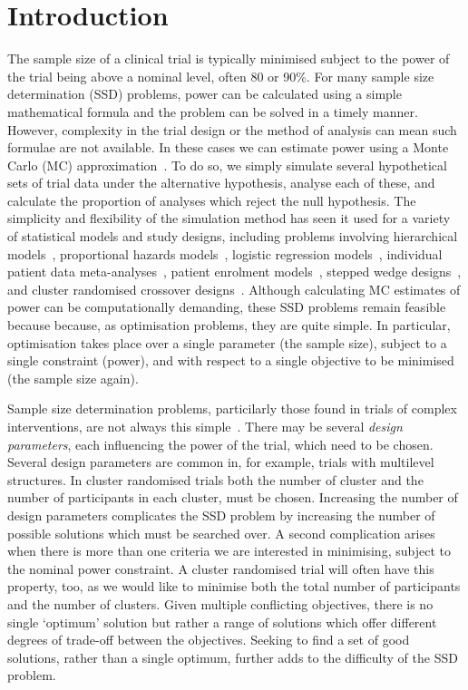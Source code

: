\documentclass{article} %
\begin{document}
\section{Introduction}\label{sec:intro}

The sample size of a clinical trial is typically minimised subject to the power of the trial being above a nominal level, often 80 or 90\%. For many sample size determination (SSD) problems, power can be calculated using a simple mathematical formula and the problem can be solved in a timely manner. However, complexity in the trial design or the method of analysis can mean such formulae are not available. In these cases we can estimate power using a Monte Carlo (MC) approximation~\cite{Arnold2011, Landau2013}. To do so, we simply simulate several hypothetical sets of trial data under the alternative hypothesis, analyse each of these, and calculate the proportion of analyses which reject the null hypothesis. The simplicity and flexibility of the simulation method has seen it used for a variety of statistical models and study designs, including problems involving hierarchical models~\cite{Feng1992, Hooper2013}, proportional hazards models~\cite{Schoenfeld2005}, logistic regression models~\cite{Grieve2016}, individual patient data meta-analyses~\cite{Sutton2007, Kontopantelis2016}, patient enrolment models~\cite{Fedorov2005}, stepped wedge designs~\cite{Baio2015, Hooper2016}, and cluster randomised crossover designs~\cite{Reich2012}. Although calculating MC estimates of power can be computationally demanding, these SSD problems remain feasible because because, as optimisation problems, they are quite simple. In particular, optimisation takes place over a single parameter (the sample size), subject to a single constraint (power), and with respect to a single objective to be minimised (the sample size again).

Sample size determination problems, particilarly those found in trials of complex interventions, are not always this simple~\cite{Wilson2015}. There may be several \emph{design parameters}, each influencing the power of the trial, which need to be chosen. Several design parameters are common in, for example, trials with multilevel structures. In cluster randomised trials both the number of cluster and the number of participants in each cluster, must be chosen. Increasing the number of design parameters complicates the SSD problem by increasing the number of possible solutions which must be searched over. A second complication arises when there is more than one criteria we are interested in minimising, subject to the nominal power constraint. A cluster randomised trial will often have this property, too, as we would like to minimise both the total number of participants and the number of clusters. Given multiple conflicting objectives, there is no single `optimum' solution but rather a range of solutions which offer different degrees of trade-off between the objectives. Seeking to find a set of good solutions, rather than a single optimum, further adds to the difficulty of the SSD problem.
\end{document}
